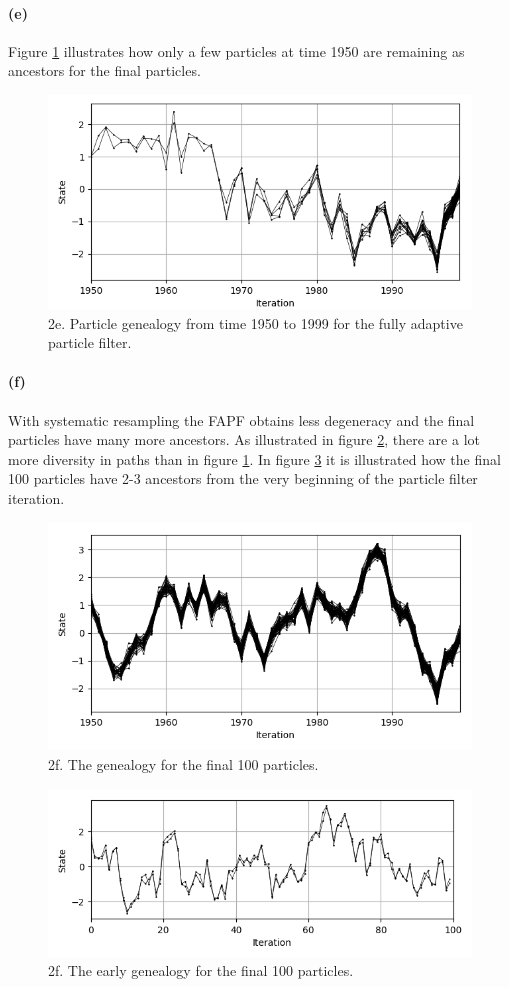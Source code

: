 \documentclass{article}
\begin{document}
\paragraph{(e)} Figure \ref{fig:2_e} illustrates how only a few particles at time 1950 are remaining as ancestors for the final particles. 
	
	\begin{figure}[t]
		\centering
		\includegraphics[width=.7\linewidth]{2_e}
		\caption{2e. Particle genealogy from time 1950 to 1999 for the fully adaptive particle filter. }
		\label{fig:2_e}
	\end{figure}

\paragraph{(f)} With systematic resampling the FAPF obtains less degeneracy and the final particles have many more ancestors. As illustrated in figure \ref{fig:2_f}, there are a lot more diversity in paths than in figure \ref{fig:2_e}. In figure \ref{fig:2_f_start} it is illustrated how the final 100 particles have 2-3 ancestors from the very beginning of the particle filter iteration.
	\begin{figure}[t]
		\centering
		\includegraphics[width=.7\linewidth]{2_f}
		\caption{2f. The genealogy for the final 100 particles.}
		\label{fig:2_f}
	\end{figure}
	\begin{figure}[t]
		\centering
		\includegraphics[width=.7\linewidth]{2_f_start}
		\caption{2f. The early genealogy for the final 100 particles.}
		\label{fig:2_f_start}
	\end{figure}
\end{document}
